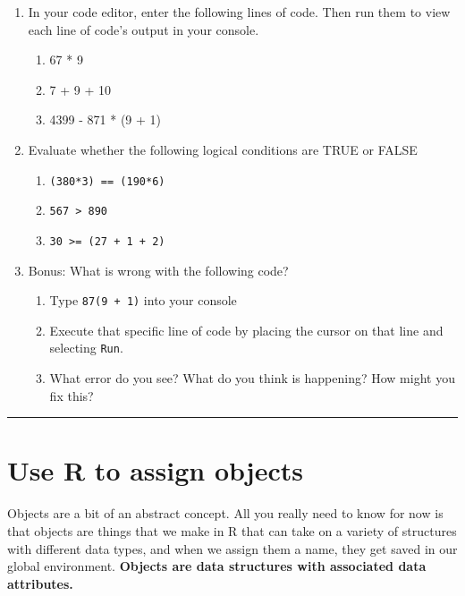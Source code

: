 \documentclass[
]{book}
\providecommand{\tightlist}{%
  \setlength{\itemsep}{0pt}\setlength{\parskip}{0pt}}
\begin{document}
\begin{enumerate}
\def\labelenumi{\arabic{enumi}.}
\tightlist
\item
  In your code editor, enter the following lines of code. Then run them to view each line of code's output in your console.

  \begin{enumerate}
  \def\labelenumii{\alph{enumii}.}
  \tightlist
  \item
    67 * 9
  \item
    7 + 9 + 10
  \item
    4399 - 871 * (9 + 1)
  \end{enumerate}
\item
  Evaluate whether the following logical conditions are TRUE or FALSE

  \begin{enumerate}
  \def\labelenumii{\alph{enumii}.}
  \tightlist
  \item
    \texttt{(380*3)\ ==\ (190*6)}
  \item
    \texttt{567\ \textgreater{}\ 890}
  \item
    \texttt{30\ \textgreater{}=\ (27\ +\ 1\ +\ 2)}
  \end{enumerate}
\item
  Bonus: What is wrong with the following code?

  \begin{enumerate}
  \def\labelenumii{\alph{enumii}.}
  \tightlist
  \item
    Type \texttt{87(9\ +\ 1)} into your console
  \item
    Execute that specific line of code by placing the cursor on that line and selecting \texttt{Run}.
  \item
    What error do you see? What do you think is happening? How might you fix this?
  \end{enumerate}
\end{enumerate}

\begin{center}\rule{0.5\linewidth}{0.5pt}\end{center}

\section{Use R to assign objects}\label{r-objects}

Objects are a bit of an abstract concept. All you really need to know for now is that objects are things that we make in R that can take on a variety of structures with different data types, and when we assign them a name, they get saved in our global environment. \textbf{Objects are data structures with associated data attributes.}
\end{document}
